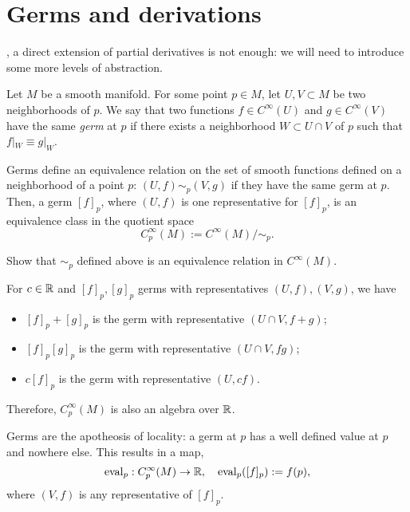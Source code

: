 \section{Germs and derivations}

, a direct extension of partial derivatives is not enough: we will need to introduce some more levels of abstraction.

\begin{definition}
  Let $M$ be a smooth manifold.
  For some point $p\in M$, let $U,V\subset M$ be two neighborhoods of $p$.
  We say that two functions $f\in C^\infty(U)$ and $g\in C^\infty(V)$ have the same \emph{germ} at $p$ if there exists a neighborhood $W\subset U\cap V$ of $p$ such that $f|_W \equiv g|_W$.
\end{definition}

Germs define an equivalence relation on the set of smooth functions defined on a neighborhood of a point $p$: $(U, f) \sim_p (V, g)$ if they have the same germ at $p$. Then, a germ $[f]_p$, where $(U, f)$ is one representative for $[f]_p$, is an equivalence class in the quotient space 
\begin{equation}
  C_p^\infty(M) := C^\infty(M)/\sim_p.
\end{equation} 

\begin{exercise}
  Show that $\sim_p$ defined above is an equivalence relation in $C^\infty(M)$.
\end{exercise}

For $c\in\mathbb{R}$ and $[f]_p, [g]_p$ germs with representatives $(U, f), (V, g)$, we have
\begin{itemize}
  \item $[f]_p + [g]_p$ is the germ with representative $(U\cap V, f+g)$;
  \item $[f]_p [g]_p$ is the germ with representative $(U\cap V, f g)$;
  \item $c[f]_p$ is the germ with representative $(U, cf)$.
\end{itemize}
Therefore, $C_p^\infty(M)$ is also an algebra over $\mathbb{R}$.

Germs are the apotheosis of locality: a germ at $p$ has a well defined value at $p$ and nowhere else.
This results in a map,
\begin{equation}
  \operatorname{eval}_p: C_p^\infty(M) \to \mathbb{R}, \quad
  \operatorname{eval}_p([f]_p) := f(p),
\end{equation}
where $(V,f)$ is any representative of $[f]_p$.

